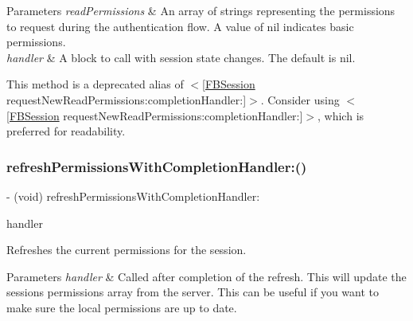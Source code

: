 \begin{DoxyParams}{Parameters}
{\em read\+Permissions} & An array of strings representing the permissions to request during the authentication flow. A value of nil indicates basic permissions.\\
\hline
{\em handler} & A block to call with session state changes. The default is nil.\\
\hline
\end{DoxyParams}
This method is a deprecated alias of $<$\mbox{[}\hyperlink{interfaceFBSession}{F\+B\+Session} request\+New\+Read\+Permissions\+:completion\+Handler\+:\mbox{]}$>$. Consider using $<$\mbox{[}\hyperlink{interfaceFBSession}{F\+B\+Session} request\+New\+Read\+Permissions\+:completion\+Handler\+:\mbox{]}$>$, which is preferred for readability. \mbox{\label{interfaceFBSession_a569f5daa686e4593bd0d5e68016a15a0}} 
\subsubsection{\texorpdfstring{refresh\+Permissions\+With\+Completion\+Handler\+:()}{refreshPermissionsWithCompletionHandler:()}\hspace{0.1cm}{\footnotesize\ttfamily [1/5]}}
{\footnotesize\ttfamily -\/ (void) refresh\+Permissions\+With\+Completion\+Handler\+: \begin{DoxyParamCaption}\item[{(F\+B\+Session\+Request\+Permission\+Result\+Handler)}]{handler }\end{DoxyParamCaption}}

Refreshes the current permissions for the session. 
\begin{DoxyParams}{Parameters}
{\em handler} & Called after completion of the refresh.  This will update the sessions\textquotesingle{} permissions array from the server. This can be useful if you want to make sure the local permissions are up to date. \\
\hline
\end{DoxyParams}
\mbox{\label{interfaceFBSession_a569f5daa686e4593bd0d5e68016a15a0}} 
